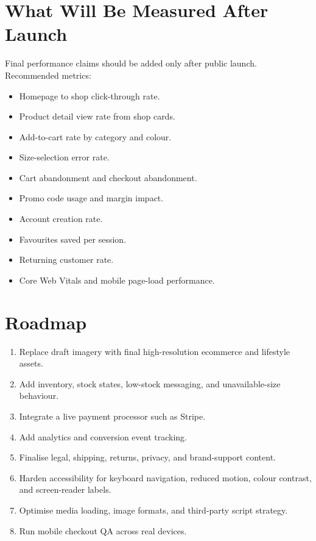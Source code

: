 \documentclass[11pt,a4paper]{article}
\begin{document}
\section{What Will Be Measured After Launch}

Final performance claims should be added only after public launch. Recommended metrics:

\begin{itemize}
    \item Homepage to shop click-through rate.
    \item Product detail view rate from shop cards.
    \item Add-to-cart rate by category and colour.
    \item Size-selection error rate.
    \item Cart abandonment and checkout abandonment.
    \item Promo code usage and margin impact.
    \item Account creation rate.
    \item Favourites saved per session.
    \item Returning customer rate.
    \item Core Web Vitals and mobile page-load performance.
\end{itemize}

\section{Roadmap}

\begin{enumerate}
    \item Replace draft imagery with final high-resolution ecommerce and lifestyle assets.
    \item Add inventory, stock states, low-stock messaging, and unavailable-size behaviour.
    \item Integrate a live payment processor such as Stripe.
    \item Add analytics and conversion event tracking.
    \item Finalise legal, shipping, returns, privacy, and brand-support content.
    \item Harden accessibility for keyboard navigation, reduced motion, colour contrast, and screen-reader labels.
    \item Optimise media loading, image formats, and third-party script strategy.
    \item Run mobile checkout QA across real devices.
\end{enumerate}
\end{document}
